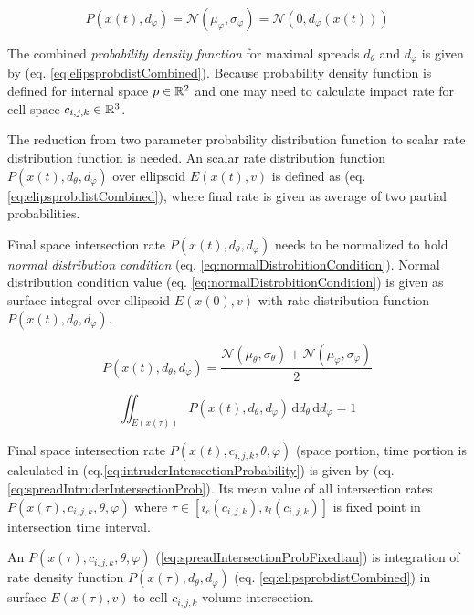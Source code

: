 \begin{equation}\label{eq:elipsprobdistVertical}
    P({x}(t),d_\varphi)=\mathscr{N}(\mu_\varphi,\sigma_\varphi)=\mathscr{N}(0,d_\varphi({x}(t)))
\end{equation}

\noindent The combined \emph{probability density function} for maximal spreads $d_\theta$ and $d_\varphi$ is given by (eq. \ref{eq:elipsprobdistCombined}). Because probability density function is defined for internal space ${p}\in\mathbb{R}^2$ and one may need to calculate impact rate for  cell space $c_{i,j,k}\in\mathbb{R}^3$. 

The reduction from two parameter probability distribution function to scalar rate distribution function is needed. An scalar rate distribution  function $P({x}(t),d_\theta,d_\varphi)$ over ellipsoid $E({x}(t),{v})$ is defined as (eq.\ref{eq:elipsprobdistCombined}), where final rate is given as average of two partial probabilities. 

Final space intersection rate $P({x}(t),d_\theta,d_\varphi)$ needs to be normalized to hold \emph{normal distribution condition} (eq. \ref{eq:normalDistrobitionCondition}). Normal distribution condition value (eq. \ref{eq:normalDistrobitionCondition}) is given as surface integral over ellipsoid $E({x}(0),{v})$ with rate distribution function $P({x}(t),d_\theta,d_\varphi)$.

\begin{equation}\label{eq:elipsprobdistCombined}
    P({x}(t),d_\theta,d_\varphi) = \frac{\mathscr{N}(\mu_\theta,\sigma_\theta)+\mathscr{N}(\mu_\varphi,\sigma_\varphi)}{2}
\end{equation}

\begin{equation}\label{eq:normalDistrobitionCondition}
    \iint_{E({x}(\tau))} P({x}(t),d_\theta,d_\varphi) \,\text{d}d_\theta\,\text{d}d_\varphi = 1
\end{equation}

\noindent Final space intersection rate  $P({x}(t),c_{i,j,k},\theta,\varphi)$  (space portion, time portion is calculated in (eq.\ref{eq:intruderIntersectionProbability}) is given by (eq. \ref{eq:spreadIntruderIntersectionProb}). Its mean value of all intersection rates $P({x}(\tau),c_{i,j,k},\theta,\varphi)$ where $\tau\in[i_e(c_{i,j,k}),i_l(c_{i,j,k})]$ is fixed point in intersection time interval.

An $P({x}(\tau),c_{i,j,k},\theta,\varphi)$ (\ref{eq:spreadIntersectionProbFixedtau}) is integration of rate density function $P({x}(\tau),d_\theta,d_\varphi)$ (eq. \ref{eq:elipsprobdistCombined}) in surface $E({x}(\tau),{v})$ to cell $c_{i,j,k}$ volume intersection. 

